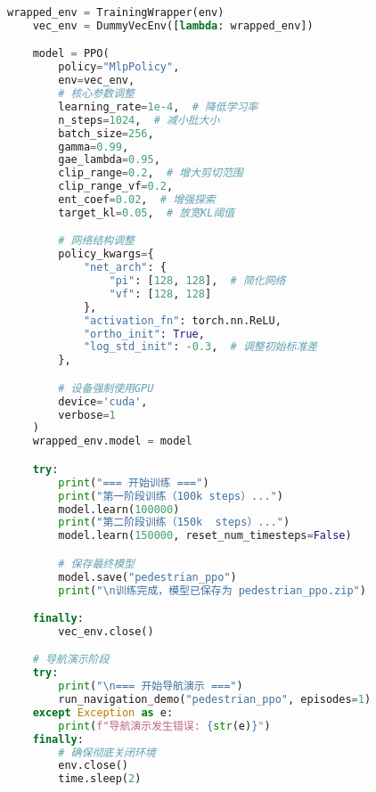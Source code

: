 \begin{lstlisting}[language=Python]
    wrapped_env = TrainingWrapper(env)
    vec_env = DummyVecEnv([lambda: wrapped_env])

    model = PPO(
        policy="MlpPolicy",
        env=vec_env,
        # 核心参数调整
        learning_rate=1e-4,  # 降低学习率
        n_steps=1024,  # 减小批大小
        batch_size=256,
        gamma=0.99,
        gae_lambda=0.95,
        clip_range=0.2,  # 增大剪切范围
        clip_range_vf=0.2,
        ent_coef=0.02,  # 增强探索
        target_kl=0.05,  # 放宽KL阈值

        # 网络结构调整
        policy_kwargs={
            "net_arch": {
                "pi": [128, 128],  # 简化网络
                "vf": [128, 128]
            },
            "activation_fn": torch.nn.ReLU,
            "ortho_init": True,
            "log_std_init": -0.3,  # 调整初始标准差
        },

        # 设备强制使用GPU
        device='cuda',
        verbose=1
    )
    wrapped_env.model = model

    try:
        print("=== 开始训练 ===")
        print("第一阶段训练（100k steps）...")
        model.learn(100000)
        print("第二阶段训练（150k  steps）...")
        model.learn(150000, reset_num_timesteps=False)

        # 保存最终模型
        model.save("pedestrian_ppo")
        print("\n训练完成，模型已保存为 pedestrian_ppo.zip")

    finally:
        vec_env.close()

    # 导航演示阶段
    try:
        print("\n=== 开始导航演示 ===")
        run_navigation_demo("pedestrian_ppo", episodes=1)
    except Exception as e:
        print(f"导航演示发生错误: {str(e)}")
    finally:
        # 确保彻底关闭环境
        env.close()
        time.sleep(2)

\end{lstlisting}
